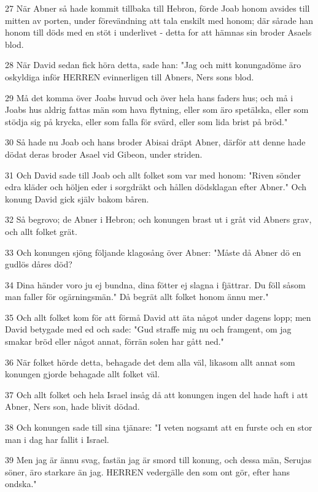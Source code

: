 \par 27 När Abner så hade kommit tillbaka till Hebron, förde Joab honom avsides till mitten av porten, under förevändning att tala enskilt med honom; där sårade han honom till döds med en stöt i underlivet - detta for att hämnas sin broder Asaels blod.
\par 28 När David sedan fick höra detta, sade han: "Jag och mitt konungadöme äro oskyldiga inför HERREN evinnerligen till Abners, Ners sons blod.
\par 29 Må det komma över Joabs huvud och över hela hans faders hus; och må i Joabs hus aldrig fattas män som hava flytning, eller som äro spetälska, eller som stödja sig på krycka, eller som falla för svärd, eller som lida brist på bröd."
\par 30 Så hade nu Joab och hans broder Abisai dräpt Abner, därför att denne hade dödat deras broder Asael vid Gibeon, under striden.
\par 31 Och David sade till Joab och allt folket som var med honom: "Riven sönder edra kläder och höljen eder i sorgdräkt och hållen dödsklagan efter Abner." Och konung David gick själv bakom båren.
\par 32 Så begrovo; de Abner i Hebron; och konungen brast ut i gråt vid Abners grav, och allt folket grät.
\par 33 Och konungen sjöng följande klagosång över Abner: "Måste då Abner dö en gudlös dåres död?
\par 34 Dina händer voro ju ej bundna, dina fötter ej slagna i fjättrar. Du föll såsom man faller för ogärningsmän." Då begrät allt folket honom ännu mer."
\par 35 Och allt folket kom för att förmå David att äta något under dagens lopp; men David betygade med ed och sade: "Gud straffe mig nu och framgent, om jag smakar bröd eller något annat, förrän solen har gått ned."
\par 36 När folket hörde detta, behagade det dem alla väl, likasom allt annat som konungen gjorde behagade allt folket väl.
\par 37 Och allt folket och hela Israel insåg då att konungen ingen del hade haft i att Abner, Ners son, hade blivit dödad.
\par 38 Och konungen sade till sina tjänare: "I veten nogsamt att en furste och en stor man i dag har fallit i Israel.
\par 39 Men jag är ännu svag, fastän jag är smord till konung, och dessa män, Serujas söner, äro starkare än jag. HERREN vedergälle den som ont gör, efter hans ondska."


